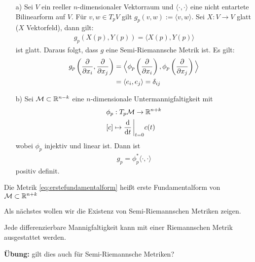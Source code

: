 \begin{bsp}
\begin{itemize}
\item[a)] Sei $V$ ein reeller $n$-dimensionaler Vektorraum und $\langle\cdot,\cdot\rangle$ eine nicht entartete Bilinearform auf $V$.
Für $v, w \in T_p V$ gilt $g_p (v, w) := \langle v, w \rangle$.
Sei $X: V \to V$ glatt ($X$ Vektorfeld), dann gilt:
\begin{align}
g_p (X(p), Y(p)) = \langle X(p), Y(p) \rangle
\end{align}
ist glatt.
Daraus folgt, dass $g$ eine Semi-Riemannsche Metrik ist.
Es gilt:
\begin{align*}
g_p \left( \pdv{x_i} , \pdv{x_j} \right) &= \Big{\langle} \phi_p \left(\pdv{x_i}\right) , \phi_p \left( \pdv{x_j} \right) \Big\rangle\\
&= \langle e_i, e_j \rangle = \delta_{ij}
\end{align*}
\item[b)] Sei $\mathcal{M} \subset \mathbb{R}^{n-k}$ eine $n$-dimensionale Untermannigfaltigkeit mit
\begin{align*}
&\phi_p: T_p\mfk \to \R^{n+k}\\
& [c] \mapsto \dv{t} \eval_{t=0} c(t)
\end{align*}
wobei $\phi_p$ injektiv und linear ist.
Dann ist 
\begin{align}
\label{eq:erstefundamentalform}
g_p = \phi^\ast_p \langle \cdot , \cdot \rangle 
\end{align}
positiv definit.
\end{itemize}
\end{bsp}
\begin{defs}
Die Metrik \ref{eq:erstefundamentalform} heißt erste Fundamentalform von $\mathcal{M} \subset \mathbb{R}^{n+k}$
\end{defs}
Als nächstes wollen wir die Existenz von Semi-Riemannschen Metriken zeigen.
\begin{satz}
\label{satz:existenz_metrik}
Jede differenzierbare Mannigfaltigkeit kann mit einer Riemannschen Metrik ausgestattet werden.
\end{satz}
\textbf{Übung:} gilt dies auch für Semi-Riemannsche Metriken?
